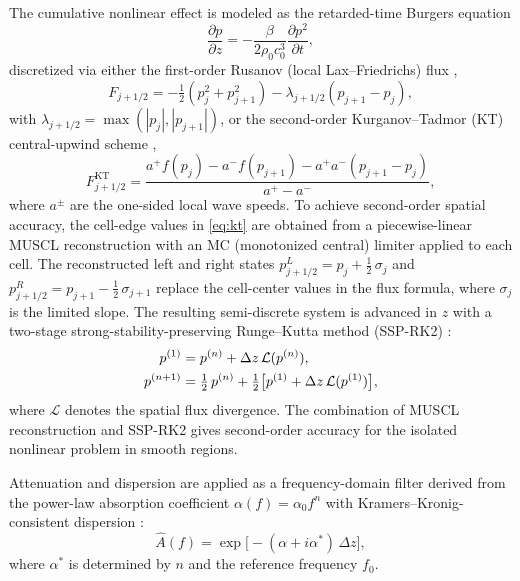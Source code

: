 \documentclass[11pt]{article}
\begin{document}
The cumulative nonlinear effect is modeled as the retarded-time
Burgers equation
\begin{equation}
  \frac{\partial p}{\partial z} = -\frac{\beta}{2\rho_0 c_0^3}
  \frac{\partial p^2}{\partial t},
  \label{eq:burgers}
\end{equation}
discretized via either the first-order Rusanov (local Lax--Friedrichs)
flux \cite{rusanov1962},
\begin{equation}
  F_{j+1/2} = -\tfrac{1}{2}(p_j^2 + p_{j+1}^2)
  - \lambda_{j+1/2}(p_{j+1} - p_j),
  \label{eq:rusanov}
\end{equation}
with $\lambda_{j+1/2} = \max(|p_j|, |p_{j+1}|)$, or the second-order
Kurganov--Tadmor (KT) central-upwind scheme \cite{kurganov2000},
\begin{equation}
  F_{j+1/2}^{\mathrm{KT}} =
  \frac{a^+ f(p_j) - a^- f(p_{j+1})
        - a^+ a^-(p_{j+1} - p_j)}{a^+ - a^-},
  \label{eq:kt}
\end{equation}
where $a^{\pm}$ are the one-sided local wave speeds.  To achieve
second-order spatial accuracy, the cell-edge values in \cref{eq:kt}
are obtained from a piecewise-linear MUSCL reconstruction
\cite{vanleer1979} with an MC (monotonized central) limiter applied to
each cell.  The reconstructed left and right states
$p_{j+1/2}^L = p_j + \tfrac{1}{2}\,\sigma_j$ and
$p_{j+1/2}^R = p_{j+1} - \tfrac{1}{2}\,\sigma_{j+1}$ replace the
cell-center values in the flux formula, where $\sigma_j$ is the
limited slope.  The resulting semi-discrete system is advanced in $z$
with a two-stage strong-stability-preserving Runge--Kutta method
(SSP-RK2) \cite{gottlieb2001}:
\begin{align}
  p^{(1)} &= p^{(n)} + \Delta z\,\mathcal{L}(p^{(n)}), \notag \\
  p^{(n+1)} &= \tfrac{1}{2}\,p^{(n)} + \tfrac{1}{2}\bigl[
    p^{(1)} + \Delta z\,\mathcal{L}(p^{(1)})\bigr],
  \label{eq:ssprk2}
\end{align}
where $\mathcal{L}$ denotes the spatial flux divergence.  The
combination of MUSCL reconstruction and SSP-RK2 gives second-order
accuracy for the isolated nonlinear problem in smooth regions.

Attenuation and dispersion are applied as a frequency-domain filter
derived from the power-law absorption coefficient
$\alpha(f) = \alpha_0 f^n$ with Kramers--Kronig-consistent dispersion
\cite{pinton2009}:
\begin{equation}
  \hat{A}(f) = \exp\bigl[-(\alpha + i\alpha^*)\,\Delta z\bigr],
  \label{eq:attenuation}
\end{equation}
where $\alpha^*$ is determined by $n$ and the reference frequency
$f_0$.
\end{document}
